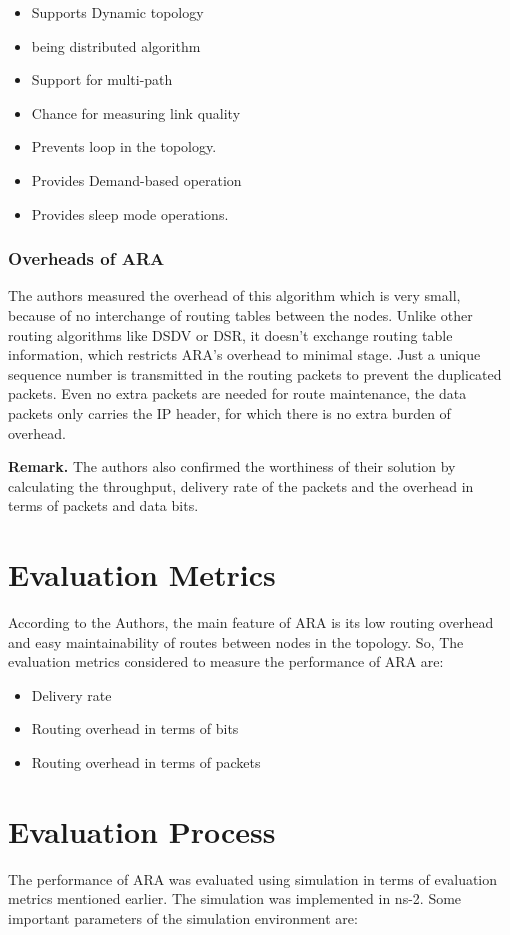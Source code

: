 \begin{itemize}
  \item Supports Dynamic topology
  \item being distributed algorithm
  \item Support for multi-path
  \item Chance for measuring link quality
  \item Prevents loop in the topology.
  \item Provides Demand-based operation
  \item Provides sleep mode operations.
\end{itemize}

\subsubsection{Overheads of ARA}
The authors measured the overhead of this algorithm which is very small, because of no interchange of routing tables between the nodes. Unlike other routing algorithms like DSDV or DSR, it doesn't exchange routing table information, which restricts ARA's overhead to minimal stage. Just a unique sequence number is transmitted in the routing packets to prevent the duplicated packets. Even  no extra packets are needed for route maintenance, the data packets only carries the IP header, for which there is no extra burden of overhead.


\textbf{Remark.} The authors also confirmed the worthiness of their solution by calculating the throughput, delivery rate of the packets and the overhead in terms of packets and data bits.


\section{Evaluation Metrics}
According to the Authors, the main feature of ARA is its low routing overhead and easy maintainability of routes between nodes in the topology. So, The evaluation metrics considered to measure the performance of ARA are:
\begin{itemize}
\item Delivery rate 
\item Routing overhead in terms of bits
\item Routing overhead in terms of packets
\end{itemize}

\section{Evaluation Process}\label{simulationenv}
The performance of ARA was evaluated using simulation in terms of evaluation metrics mentioned earlier. 
The simulation was implemented in ns-2. Some important parameters of the simulation environment are:

